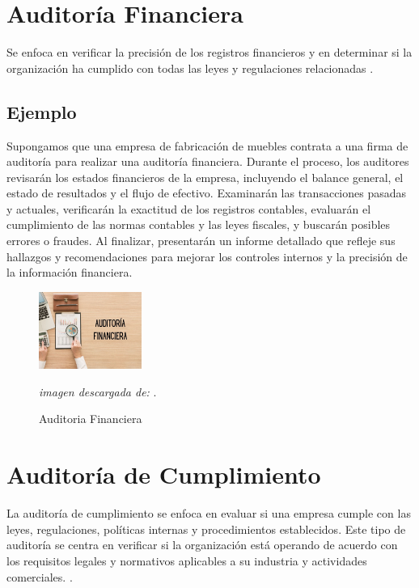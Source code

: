 \documentclass[12pt,a4paper]{article}
\begin{document}
\newpage
\section{Auditoría Financiera} 
Se enfoca en verificar la precisión de los registros financieros y en determinar si la organización ha cumplido con todas las leyes y regulaciones relacionadas
\cite{audit_financiera}.

\subsection*{Ejemplo}
Supongamos que una empresa de fabricación de muebles contrata a una firma de auditoría para realizar una auditoría financiera. Durante el proceso, los auditores revisarán los estados financieros de la empresa, incluyendo el balance general, el estado de resultados y el flujo de efectivo. Examinarán las transacciones pasadas y actuales, verificarán la exactitud de los registros contables, evaluarán el cumplimiento de las normas contables y las leyes fiscales, y buscarán posibles errores o fraudes. Al finalizar, presentarán un informe detallado que refleje sus hallazgos y recomendaciones para mejorar los controles internos y la precisión de la información financiera.
\begin{figure}[!htb]
    \centering
    \caption{Auditoria Financiera} 

    \includegraphics[width=0.3\textwidth]{images/audi_financiera.jpg}
    \par
    \textit{imagen descargada de:} \cite{fig_financiera}.

\end{figure}


\newpage
\section{Auditoría de Cumplimiento} 
La auditoría de cumplimiento se enfoca en evaluar si una empresa cumple con las leyes, regulaciones, políticas internas y procedimientos establecidos. Este tipo de auditoría se centra en verificar si la organización está operando de acuerdo con los requisitos legales y normativos aplicables a su industria y actividades comerciales.
\cite{audit_cumplimiento}.
\end{document}
